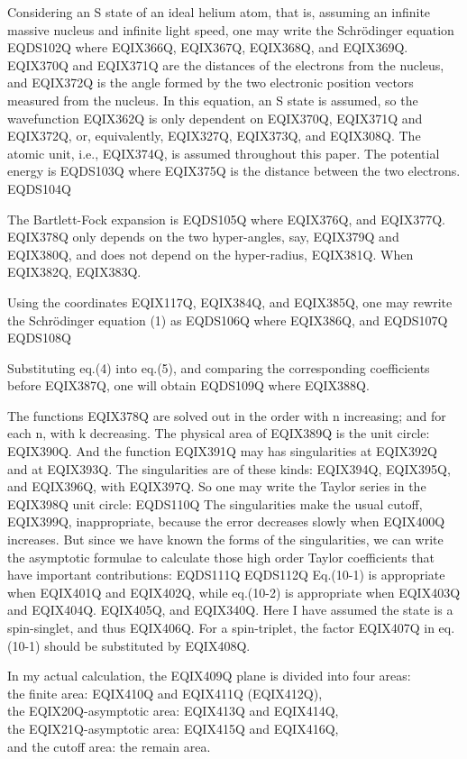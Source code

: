 Considering an S state of an ideal helium atom, that is, assuming an infinite
massive nucleus and infinite light speed, one may write the Schr\"{o}dinger
equation
 EQDS102Q 
where EQIX366Q, EQIX367Q,
EQIX368Q, and
EQIX369Q. EQIX370Q and EQIX371Q
are the distances of the electrons from the nucleus, and EQIX372Q
is the angle formed by the two electronic position vectors measured from the
nucleus. In this equation, an S state is assumed, so the wavefunction
EQIX362Q is only dependent on EQIX370Q, EQIX371Q and EQIX372Q, or, equivalently,
EQIX327Q, EQIX373Q, and EQIX308Q. The atomic unit, i.e.,
EQIX374Q, is assumed throughout this paper.
The potential energy is
 EQDS103Q 
where EQIX375Q is the distance between the two electrons.
 EQDS104Q 

\vspace{3mm}
The Bartlett-Fock expansion is
 EQDS105Q 
where EQIX376Q, and EQIX377Q.
EQIX378Q only depends on the two hyper-angles, say,
EQIX379Q and EQIX380Q, and does not depend
on the hyper-radius, EQIX381Q. When EQIX382Q, 
EQIX383Q.

Using the coordinates EQIX117Q, EQIX384Q, and EQIX385Q, one may rewrite
the Schr\"{o}dinger equation (1) as
 EQDS106Q 
where EQIX386Q, and
 EQDS107Q 
 EQDS108Q 

Substituting eq.(4) into eq.(5), and comparing the corresponding coefficients
before EQIX387Q, one will obtain
 EQDS109Q 
where EQIX388Q.

The functions EQIX378Q are solved out in the order
with n increasing; and for each n, with k decreasing. The physical
area of EQIX389Q is the unit circle: EQIX390Q.
And the function EQIX391Q may has singularities at
EQIX392Q and at EQIX393Q. The singularities are of these kinds:
EQIX394Q, EQIX395Q, and EQIX396Q, with
EQIX397Q. So one may write
the Taylor series in the EQIX398Q unit circle:
 EQDS110Q 
The singularities make the usual cutoff, EQIX399Q, inappropriate, because
the error decreases slowly when EQIX400Q increases.
But since we have known the forms of the singularities, we can write the
asymptotic formulae to calculate those high order Taylor coefficients that
have important contributions:
 EQDS111Q 
 EQDS112Q 
Eq.(10-1) is appropriate when EQIX401Q and EQIX402Q,
while eq.(10-2) is appropriate when EQIX403Q and EQIX404Q.
EQIX405Q, and EQIX340Q.
Here I have assumed the state is a spin-singlet, and thus
EQIX406Q. For a spin-triplet,
the factor EQIX407Q in eq.(10-1) should be substituted by
EQIX408Q.

In my actual calculation, the EQIX409Q plane is divided into four areas:\\
the finite area: EQIX410Q and EQIX411Q (EQIX412Q),\\
the EQIX20Q-asymptotic area: EQIX413Q and EQIX414Q,\\
the EQIX21Q-asymptotic area: EQIX415Q and EQIX416Q,\\
and the cutoff area: the remain area.

